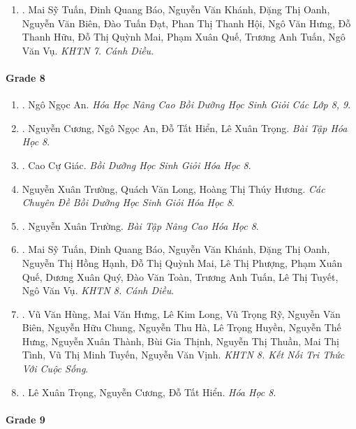 \documentclass{article}
\begin{document}
\begin{enumerate}
	\item \cite{SGK_KHTN_7_Canh_Dieu}. Mai Sỹ Tuấn, Đinh Quang Báo, Nguyễn Văn Khánh, Đặng Thị Oanh, Nguyễn Văn Biên, Đào Tuấn Đạt, Phan Thị Thanh Hội, Ngô Văn Hưng, Đỗ Thanh Hữu, Đỗ Thị Quỳnh Mai, Phạm Xuân Quế, Trương Anh Tuấn, Ngô Văn Vụ. {\it KHTN 7. Cánh Diều}.\hfill{\sf[reading]}
\end{enumerate}

\paragraph{Grade 8}

\begin{enumerate}
	\item \cite{An_Hoa_Hoc_nang_cao_8_9}. Ngô Ngọc An. {\it Hóa Học Nâng Cao Bồi Dưỡng Học Sinh Giỏi Các Lớp 8, 9}.\hfill{\sf[done]}
	\item \cite{SBT_Hoa_Hoc_8}. Nguyễn Cương, Ngô Ngọc An, Đỗ Tất Hiển, Lê Xuân Trọng. {\it Bài Tập Hóa Học 8}.\hfill{\sf[reading]}
	\item \cite{Giac2021}. Cao Cự Giác. {\it Bồi Dưỡng Học Sinh Giỏi Hóa Học 8}.\hfill{\sf[reading]}
	\item Nguyễn Xuân Trường, Quách Văn Long, Hoàng Thị Thúy Hương. {\it Các Chuyên Đề Bồi Dưỡng Học Sinh Giỏi Hóa Học 8}.
	\item \cite{Truong_BTNC_Hoa_Hoc_8_2022}. Nguyễn Xuân Trường. {\it Bài Tập Nâng Cao Hóa Học 8}.\hfill{\sf[reading]}
	\item \cite{SGK_KHTN_8_Canh_Dieu}. Mai Sỹ Tuấn, Đinh Quang Báo, Nguyễn Văn Khánh, Đặng Thị Oanh, Nguyễn Thị Hồng Hạnh, Đỗ Thị Quỳnh Mai, Lê Thị Phượng, Phạm Xuân Quế, Dương Xuân Quý, Đào Văn Toàn, Trương Anh Tuấn, Lê Thị Tuyết, Ngô Văn Vụ. {\it KHTN 8. Cánh Diều}.\hfill{\sf[reading]}
	\item \cite{SGK_KHTN_8_KNTTVCS}. Vũ Văn Hùng, Mai Văn Hưng, Lê Kim Long, Vũ Trọng Rỹ, Nguyễn Văn Biên, Nguyễn Hữu Chung, Nguyễn Thu Hà, Lê Trọng Huyền, Nguyễn Thế Hưng, Nguyễn Xuân Thành, Bùi Gia Thịnh, Nguyễn Thị Thuần, Mai Thị Tình, Vũ Thị Minh Tuyến, Nguyễn Văn Vịnh. {\it KHTN 8. Kết Nối Tri Thức Với Cuộc Sống}.\hfill{\sf[reading]}
	\item \cite{SGK_Hoa_Hoc_8}. Lê Xuân Trọng, Nguyễn Cương, Đỗ Tất Hiển. {\it Hóa Học 8}.\hfill{\sf[reading]}
\end{enumerate}

\paragraph{Grade 9}
\end{document}
